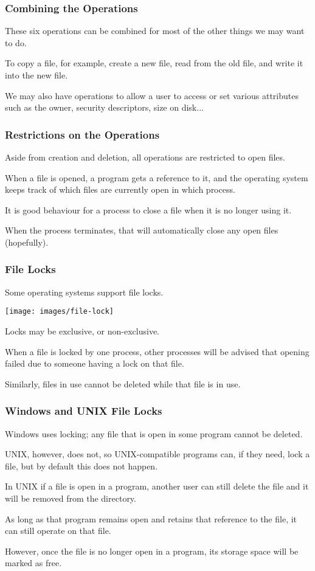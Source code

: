 \begin{frame}
	\frametitle{Combining the Operations}

	These six operations can be combined for most of the other things we may want to do.

	To copy a file, for example, create a new file, read from the old file, and write it into the new file.

	We may also have operations to allow a user to access or set various attributes such as the owner, security descriptors, size on disk...

\end{frame}

\begin{frame}
	\frametitle{Restrictions on the Operations}

	Aside from creation and deletion, all operations are restricted to open files.

	When a file is opened, a program gets a reference to it, and the operating system keeps track of which files are currently open in which process.

	It is good behaviour for a process to close a file when it is no longer using it.

	When the process terminates, that will automatically close any open files (hopefully).

\end{frame}

\begin{frame}
	\frametitle{File Locks}

	Some operating systems support file locks.

	\begin{center}
		\texttt{[image: images/file-lock]}
	\end{center}

	Locks may be exclusive, or non-exclusive.

	When a file is locked by one process, other processes will be advised that opening failed due to someone having a lock on that file.

	Similarly, files in use cannot be deleted while that file is in use.

\end{frame}

\begin{frame}
	\frametitle{Windows and UNIX File Locks}

	Windows uses locking; any file that is open in some program cannot be deleted.

	UNIX, however, does not, so UNIX-compatible programs can, if they need, lock a file, but by default this does not happen.

	In UNIX if a file is open in a program, another user can still delete the file and it will be removed from the directory.

	As long as that program remains open and retains that reference to the file, it can still operate on that file.

	However, once the file is no longer open in a program, its storage space will be marked as free.

\end{frame}



